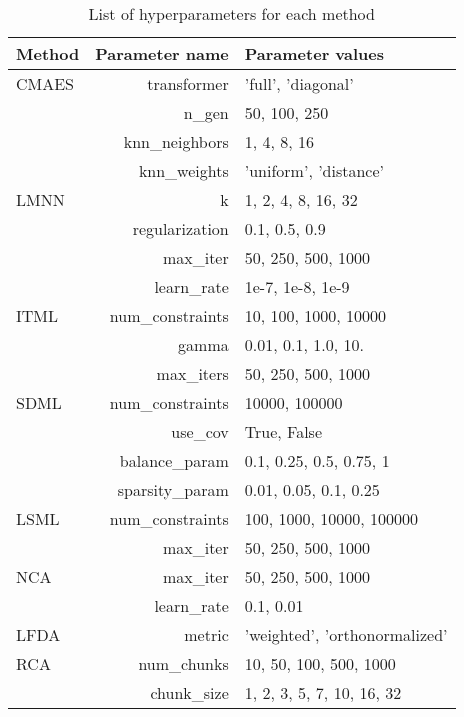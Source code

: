 \begin{table}[ht] \centering
\begin{tabular}{lrl}
\hline
Method & Parameter name & Parameter values \\
\hline

CMAES
    & transformer & 'full', 'diagonal'  \\
    & n\_gen & 50, 100, 250  \\
    & knn\_neighbors & 1, 4, 8, 16  \\
    & knn\_weights & 'uniform', 'distance'  \\

LMNN
    & k & 1, 2, 4, 8, 16, 32  \\
    & regularization & 0.1, 0.5, 0.9  \\
    & max\_iter & 50, 250, 500, 1000  \\
    & learn\_rate & 1e-7, 1e-8, 1e-9  \\

ITML
    & num\_constraints & 10, 100, 1000, 10000  \\
    & gamma & 0.01, 0.1, 1.0, 10.  \\
    & max\_iters & 50, 250, 500, 1000  \\

SDML
    & num\_constraints & 10000, 100000  \\
    & use\_cov & True, False  \\
    & balance\_param & 0.1, 0.25, 0.5, 0.75, 1  \\
    & sparsity\_param & 0.01, 0.05, 0.1, 0.25  \\

LSML
    & num\_constraints & 100, 1000, 10000, 100000  \\
    & max\_iter & 50, 250, 500, 1000  \\

NCA
    & max\_iter & 50, 250, 500, 1000  \\
    & learn\_rate & 0.1, 0.01  \\

LFDA
    & metric & 'weighted', 'orthonormalized'  \\

RCA
    & num\_chunks & 10, 50, 100, 500, 1000  \\
    & chunk\_size & 1, 2, 3, 5, 7, 10, 16, 32  \\

\hline
\end{tabular}
\caption{List of hyperparameters for each method} \label{tab:hyperparams}
\end{table}
